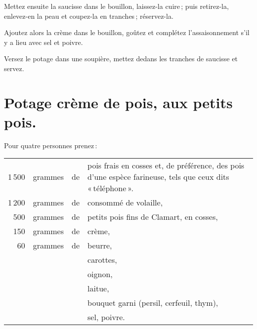 Mettez ensuite la saucisse dans le bouillon, laissez-la cuire ; puis
retirez-la, enlevez-en la peau et coupez-la en tranches ; réservez-la.

Ajoutez alors la crème dans le bouillon, goûtez et complétez l'assaisonnement
s'il y a lieu avec sel et poivre.

Versez le potage dans une soupière, mettez dedans les tranches de saucisse et
servez.

\section*{\centering Potage crème de pois, aux petits pois.}

Pour quatre personnes prenez :

\medskip

\footnotesize
\begin{longtable}{rrrp{16em}}                                                    
  1 500 & grammes & de & pois frais en cosses et, de préférence, des pois d'une 
                         espèce farineuse, tels que ceux dits « téléphone ».                              \\
  1 200 & grammes & de & consommé de volaille,                                                            \\
    500 & grammes & de & petits pois fins de Clamart, en cosses,                                          \\
    150 & grammes & de & crème,                                                                           \\
     60 & grammes & de & beurre,                                                                          \\
        &         &    & carottes,                                                                        \\
        &         &    & oignon,                                                                          \\
        &         &    & laitue,                                                                          \\
        &         &    & bouquet garni (persil, cerfeuil, thym),                                          \\
        &         &    & sel, poivre.                                                                     \\
\end{longtable}
\normalsize


